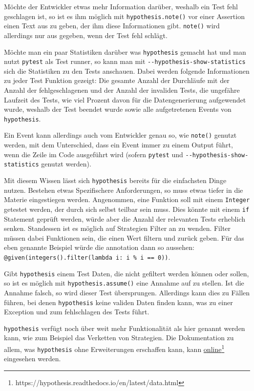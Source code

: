 Möchte der Entwickler etwas mehr Information darüber, weshalb ein Test fehl 
geschlagen ist, so ist es ihm möglich mit \lstinline{hypothesis.note()} vor 
einer Assertion einen Text aus zu geben, der ihm diese Informationen gibt. 
\lstinline{note()} wird
allerdings nur aus gegeben, wenn der Test fehl schlägt.

Möchte man ein paar Statistiken darüber was \lstinline{hypothesis} gemacht hat 
und man nutzt \lstinline{pytest} als Test runner, so kann man mit 
\lstinline{--hypothesis-show-statistics} sich die Statistiken zu den Tests 
anschauen. Dabei werden folgende Informationen zu jeder Test Funktion gezeigt:
Die gesamte Anzahl der Durchläufe mit der Anzahl der fehlgeschlagenen und der 
Anzahl der invaliden Tests, die ungefähre Laufzeit des Tests, wie viel Prozent 
davon für die Datengenerierung aufgewendet wurde, weshalb der Test beendet 
wurde sowie alle aufgetretenen Events von \lstinline{hypothesis}.

Ein Event kann allerdings auch vom Entwickler genau so, wie \lstinline{note()} 
genutzt werden, mit dem Unterschied, dass ein Event immer zu einem Output 
führt, wenn die Zeile im Code ausgeführt wird (sofern \lstinline{pytest} und 
\lstinline{--hypothesis-show-statistics} genutzt werden).

Mit diesem Wissen lässt sich \lstinline{hypothesis} bereits für die einfachsten 
Dinge nutzen. Bestehen etwas Spezifischere Anforderungen, so muss etwas tiefer
in die Materie eingestiegen werden. Angenommen, eine Funktion soll mit einem
\lstinline{Integer} getestet werden, der durch sich selbst teilbar sein muss.
Dies könnte mit einem \lstinline{if} Statement geprüft werden, würde aber die 
Anzahl der relevanten Tests erheblich senken. Standessen ist es möglich auf 
Strategien Filter an zu wenden. Filter müssen dabei Funktionen sein, die einen 
Wert filtern und zurück geben. Für das eben genannte Beispiel würde die 
\Gls{annotation} dann so aussehen:
\lstinline{@given(integers().filter(lambda i: i % i == 0))}.

Gibt \lstinline{hypothesis} einem Test Daten, die nicht gefiltert werden können 
oder sollen, so ist es möglich mit \lstinline{hypothesis.assume()} eine Annahme 
auf zu stellen. Ist die Annahme falsch, so wird dieser Test übersprungen. 
Allerdings kann dies zu Fällen führen, bei denen \lstinline{hypothesis} keine 
validen Daten finden kann, was zu einer Exception und zum fehlschlagen des 
Tests führt.

\lstinline{hypothesis} verfügt noch über weit mehr Funktionalität als hier 
genannt werden kann, wie zum Beispiel das Verketten von Strategien. Die 
Dokumentation zu allem, was \lstinline{hypothesis} ohne Erweiterungen 
erschaffen kann, kann 
\href{https://hypothesis.readthedocs.io/en/latest/data.html}{online}\footnote{https://hypothesis.readthedocs.io/en/latest/data.html}
eingesehen werden.

